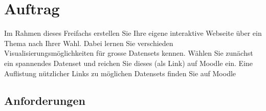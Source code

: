 

\section*{Auftrag}

Im Rahmen dieses Freifachs erstellen Sie Ihre eigene interaktive Webseite über ein Thema nach Ihrer Wahl. Dabei lernen Sie verschieden Visualisierungsmöglichkeiten für grosse Datensets kennen. Wählen Sie zunächst ein spannendes Datenset und reichen Sie dieses (als Link) auf Moodle ein. Eine Auflistung nützlicher Links zu möglichen Datensets finden Sie auf Moodle

\subsection*{Anforderungen}


